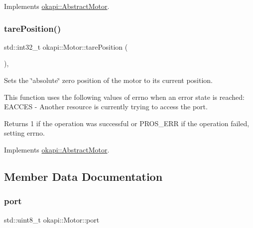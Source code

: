Implements \mbox{\hyperlink{classokapi_1_1AbstractMotor_a2f33faf946b99cd34e9a591ccc33d644}{okapi\+::\+Abstract\+Motor}}.

\mbox{\label{classokapi_1_1Motor_aa71f3d93b734caec5c9245b211d4a0ad}} 
\subsubsection{\texorpdfstring{tarePosition()}{tarePosition()}}
{\footnotesize\ttfamily std\+::int32\+\_\+t okapi\+::\+Motor\+::tare\+Position (\begin{DoxyParamCaption}{ }\end{DoxyParamCaption})\hspace{0.3cm}{\ttfamily [override]}, {\ttfamily [virtual]}}

Sets the \char`\"{}absolute\char`\"{} zero position of the motor to its current position.

This function uses the following values of errno when an error state is reached\+: E\+A\+C\+C\+ES -\/ Another resource is currently trying to access the port.

\begin{DoxyReturn}{Returns}
1 if the operation was successful or P\+R\+O\+S\+\_\+\+E\+RR if the operation failed, setting errno. 
\end{DoxyReturn}


Implements \mbox{\hyperlink{classokapi_1_1AbstractMotor_ac36edbc92db85a11adcfee56275de15b}{okapi\+::\+Abstract\+Motor}}.



\subsection{Member Data Documentation}
\mbox{\label{classokapi_1_1Motor_a25a8cc5b2fe8e50d83c42129b0d57b7e}} 
\subsubsection{\texorpdfstring{port}{port}}
{\footnotesize\ttfamily std\+::uint8\+\_\+t okapi\+::\+Motor\+::port\hspace{0.3cm}{\ttfamily [protected]}}

